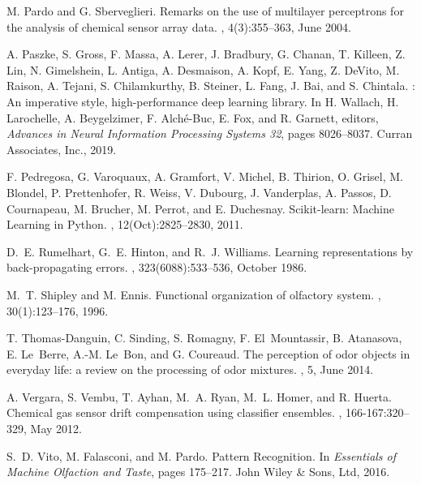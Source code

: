 \documentclass[onecolumn,pre,floats,aps,amsmath,amssymb,superscriptaddress]{revtex4-1}
\begin{document}
\begin{thebibliography}{10}
M. Pardo and G. Sberveglieri.
\newblock Remarks on the use of multilayer perceptrons for the analysis of
  chemical sensor array data.
, 4(3):355--363, June 2004.

A. Paszke, S. Gross, F. Massa, A. Lerer, J. Bradbury, G. Chanan, T. Killeen, Z.
  Lin, N. Gimelshein, L. Antiga, A. Desmaison, A. Kopf, E. Yang, Z. DeVito, M.
  Raison, A. Tejani, S. Chilamkurthy, B. Steiner, L. Fang, J. Bai, and S.
  Chintala.
: {An} imperative style, high-performance deep learning
  library.
\newblock In H. Wallach, H. Larochelle, A. Beygelzimer, F. Alché-Buc, E. Fox,
  and R. Garnett, editors, {\em Advances in {Neural} {Information} {Processing}
  {Systems} 32}, pages 8026--8037. Curran Associates, Inc., 2019.

F. Pedregosa, G. Varoquaux, A. Gramfort, V. Michel, B. Thirion, O. Grisel, M.
  Blondel, P. Prettenhofer, R. Weiss, V. Dubourg, J. Vanderplas, A. Passos, D.
  Cournapeau, M. Brucher, M. Perrot, and E. Duchesnay.
\newblock Scikit-learn: {Machine} {Learning} in {Python}.
, 12(Oct):2825--2830, 2011.

D.~E. Rumelhart, G.~E. Hinton, and R.~J. Williams.
\newblock Learning representations by back-propagating errors.
, 323(6088):533--536, October 1986.

M.~T. Shipley and M. Ennis.
\newblock Functional organization of olfactory system.
, 30(1):123--176, 1996.

T. Thomas-Danguin, C. Sinding, S. Romagny, F. El~Mountassir, B. Atanasova, E.
  Le~Berre, A.-M. Le~Bon, and G. Coureaud.
\newblock The perception of odor objects in everyday life: a review on the
  processing of odor mixtures.
, 5, June 2014.

A. Vergara, S. Vembu, T. Ayhan, M.~A. Ryan, M.~L. Homer, and R. Huerta.
\newblock Chemical gas sensor drift compensation using classifier ensembles.
, 166-167:320--329, May 2012.

S.~D. Vito, M. Falasconi, and M. Pardo.
\newblock Pattern {Recognition}.
\newblock In {\em Essentials of {Machine} {Olfaction} and {Taste}}, pages
  175--217. John Wiley \& Sons, Ltd, 2016.

\end{thebibliography}

\end{document}
